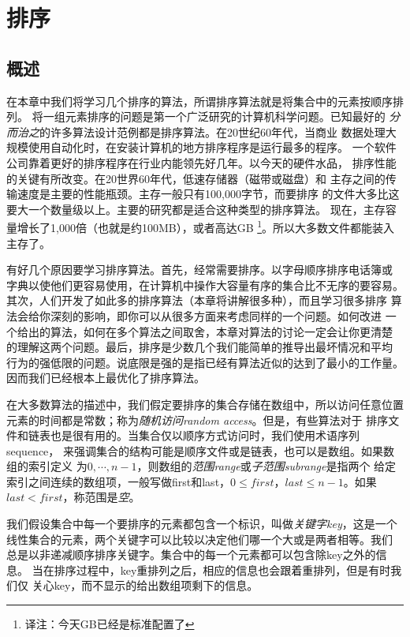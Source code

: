 \chapter{排序}\label{Sec:Chapter:Sort}

\section{概述}
在本章中我们将学习几个排序的算法，所谓排序算法就是将集合中的元素按顺序排列。
将一组元素排序的问题是第一个广泛研究的计算机科学问题。已知最好的
\emph{分而治之}的许多算法设计范例都是排序算法。在20世纪60年代，当商业
数据处理大规模使用自动化时，在安装计算机的地方排序程序是运行最多的程序。
一个软件公司靠着更好的排序程序在行业内能领先好几年。以今天的硬件水品，
排序性能的关键有所改变。在20世界60年代，低速存储器（磁带或磁盘）和
主存之间的传输速度是主要的性能瓶颈。主存一般只有100,000字节，而要排序
的文件大多比这要大一个数量级以上。主要的研究都是适合这种类型的排序算法。
现在，主存容量增长了1,000倍（也就是约100MB），或者高达GB
\footnote{译注：今天GB已经是标准配置了}。所以大多数文件都能装入主存了。

有好几个原因要学习排序算法。首先，经常需要排序。以字母顺序排序电话簿或
字典以使他们更容易使用，在计算机中操作大容量有序的集合比不无序的要容易。
其次，人们开发了如此多的排序算法（本章将讲解很多种），而且学习很多排序
算法会给你深刻的影响，即你可以从很多方面来考虑同样的一个问题。如何改进
一个给出的算法，如何在多个算法之间取舍，本章对算法的讨论一定会让你更清楚
的理解这两个问题。最后，排序是少数几个我们能简单的推导出最坏情况和平均
行为的强低限的问题。说底限是强的是指已经有算法近似的达到了最小的工作量。
因而我们已经根本上最优化了排序算法。

在大多数算法的描述中，我们假定要排序的集合存储在数组中，所以访问任意位置
元素的时间都是常数；称为\emph{随机访问random access}。但是，有些算法对于
排序文件和链表也是很有用的。当集合仅以顺序方式访问时，我们使用术语序列sequence，
来强调集合的结构可能是顺序文件或是链表，也可以是数组。如果数组的索引定义
为$0,\cdots, n-1$，则数组的\emph{范围range}或\emph{子范围subrange}是指两个
给定索引之间连续的数组项，一般写做first和last，$0\leq first$，$last\leq n-1$。如果
$last<first$，称范围是\emph{空}。

我们假设集合中每一个要排序的元素都包含一个标识，叫做\emph{关键字key}，这是一个
线性集合的元素，两个关键字可以比较以决定他们哪一个大或是两者相等。我们
总是以非递减顺序排序关键字。集合中的每一个元素都可以包含除key之外的信息。
当在排序过程中，key重排列之后，相应的信息也会跟着重排列，但是有时我们仅
关心key，而不显示的给出数组项剩下的信息。

